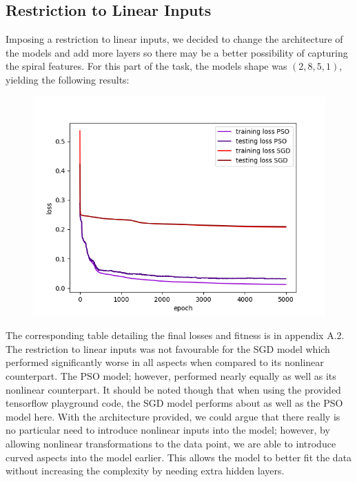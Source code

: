 \documentclass[12pt]{article}
\begin{document}
\subsection{Restriction to Linear Inputs}
Imposing a restriction to linear inputs, we decided to change the architecture of the models and add more layers so there may be a better possibility of capturing the spiral features. 
For this part of the task, the models shape was $(2, 8, 5, 1)$, yielding the following results:
\begin{figure}[h]                   
      \begin{center}                  
          \includegraphics[scale=0.45]{figures/linear.png}    
      \end{center}                                                                                              
\end{figure}
The corresponding table detailing the final losses and fitness is in appendix A.2.
The restriction to linear inputs was not favourable for the SGD model which performed significantly worse in all aspects when compared to its nonlinear counterpart. 
The PSO model; however, performed nearly equally as well as its nonlinear counterpart.
It should be noted though that when using the provided tensorflow playground code, the SGD model performs about as well as the PSO model here.
With the architecture provided, we could argue that there really is no particular need to introduce nonlinear inputs into the model; however, by allowing nonlinear transformations to the data point, we are able to introduce curved aspects into the model earlier. This allows the model to better fit the data without increasing the complexity by needing extra hidden layers.  
\end{document}
